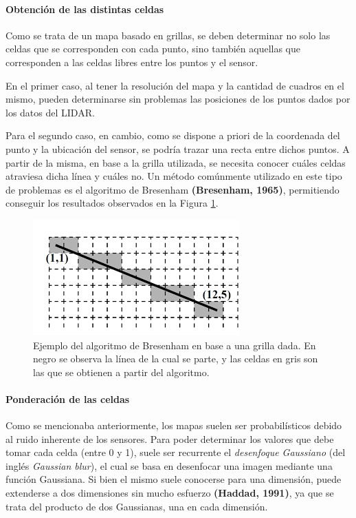 \paragraph{Obtención de las distintas celdas}
Como se trata de un mapa basado en grillas, se deben determinar no solo las celdas que se corresponden con cada punto, sino también aquellas que corresponden a las celdas libres entre los puntos y el sensor.

En el primer caso, al tener la resolución del mapa y la cantidad de cuadros en el mismo, pueden determinarse sin problemas las posiciones de los puntos dados por los datos del LIDAR. 

Para el segundo caso, en cambio, como se dispone a priori de la coordenada del punto y la ubicación del sensor, se podría trazar una recta entre dichos puntos. A partir de la misma, en base a la grilla utilizada, se necesita conocer cuáles celdas atraviesa dicha línea y cuáles no. Un método comúnmente utilizado en este tipo de problemas es el algoritmo de Bresenham \textbf{(Bresenham, 1965)}, permitiendo conseguir los resultados observados en la Figura \ref{fig:bresenhamlinealgorithm}.

\begin{figure}[!ht]
    \centering
    \includegraphics[width=0.9\linewidth]{Img/BresenhamLineAlgorithm.png}
    \caption{Ejemplo del algoritmo de Bresenham en base a una grilla dada. En negro se observa la línea de la cual se parte, y las celdas en gris son las que se obtienen a partir del algoritmo.}
    \label{fig:bresenhamlinealgorithm}
\end{figure}

\paragraph{Ponderación de las celdas}
Como se mencionaba anteriormente, los mapas suelen ser probabilísticos debido al ruido inherente de los sensores. Para poder determinar los valores que debe tomar cada celda (entre 0 y 1), suele ser recurrente el \textit{desenfoque Gaussiano} (del inglés \textit{Gaussian blur}), el cual se basa en desenfocar una imagen mediante una función Gaussiana. Si bien el mismo suele conocerse para una dimensión, puede extenderse a dos dimensiones sin mucho esfuerzo \textbf{(Haddad, 1991)}, ya que se trata del producto de dos Gaussianas, una en cada dimensión.

